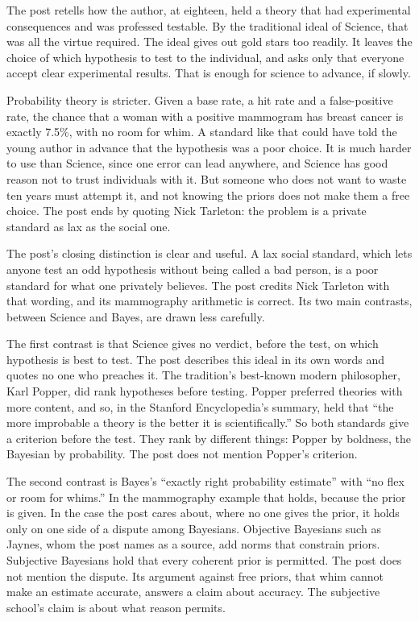 \begin{afterword}
\summaryhead

The post retells how the author, at eighteen, held a theory that had experimental consequences and was professed testable. By the traditional ideal of Science, that was all the virtue required. The ideal gives out gold stars too readily. It leaves the choice of which hypothesis to test to the individual, and asks only that everyone accept clear experimental results. That is enough for science to advance, if slowly.

Probability theory is stricter. Given a base rate, a hit rate and a false-positive rate, the chance that a woman with a positive mammogram has breast cancer is exactly 7.5\%, with no room for whim. A standard like that could have told the young author in advance that the hypothesis was a poor choice. It is much harder to use than Science, since one error can lead anywhere, and Science has good reason not to trust individuals with it. But someone who does not want to waste ten years must attempt it, and not knowing the priors does not make them a free choice. The post ends by quoting Nick Tarleton: the problem is a private standard as lax as the social one.

\responsehead

The post's closing distinction is clear and useful. A lax social standard, which lets anyone test an odd hypothesis without being called a bad person, is a poor standard for what one privately believes. The post credits Nick Tarleton with that wording, and its mammography arithmetic is correct. Its two main contrasts, between Science and Bayes, are drawn less carefully.

The first contrast is that Science gives no verdict, before the test, on which hypothesis is best to test. The post describes this ideal in its own words and quotes no one who preaches it. The tradition's best-known modern philosopher, Karl Popper, did rank hypotheses before testing. Popper preferred theories with more content, and so, in the Stanford Encyclopedia's summary, held that ``the more improbable a theory is the better it is scientifically.'' So both standards give a criterion before the test. They rank by different things: Popper by boldness, the Bayesian by probability. The post does not mention Popper's criterion.

The second contrast is Bayes's ``exactly right probability estimate'' with ``no flex or room for whims.'' In the mammography example that holds, because the prior is given. In the case the post cares about, where no one gives the prior, it holds only on one side of a dispute among Bayesians. Objective Bayesians such as Jaynes, whom the post names as a source, add norms that constrain priors. Subjective Bayesians hold that every coherent prior is permitted. The post does not mention the dispute. Its argument against free priors, that whim cannot make an estimate accurate, answers a claim about accuracy. The subjective school's claim is about what reason permits.


\end{afterword}
